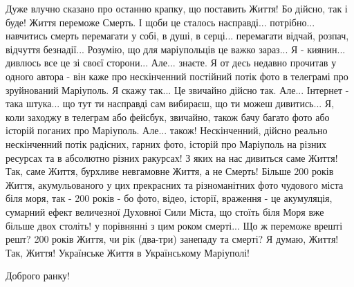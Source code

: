 
Дуже влучно сказано про останню крапку, що поставить Життя! Бо дійсно, так і
буде! Життя переможе Смерть. І щоби це сталось насправді... потрібно...
навчитись смерть перемагати у собі, в душі, в серці... перемагати відчай,
розпач, відчуття безнадії... Розумію, що для маріупольців це важко зараз... Я -
киянин... дивлюсь все це зі своєї сторони... Але... знаєте. Я от десь недавно
прочитав у одного автора - він каже про нескінченний постійний потік фото  в
телеграмі про зруйнований Маріуполь. Я скажу так... Це звичайно дійсно так.
Але... Інтернет - така штука... що тут ти насправді сам вибираєш, що ти можеш
дивитись... Я, коли заходжу в телеграм або фейсбук, звичайно, також бачу багато
фото або історій поганих про Маріуполь. Але... також! Нескінченний, дійсно
реально нескінченний потік радісних, гарних фото, історій про Маріуполь на
різних ресурсах та в абсолютно різних ракурсах! З яких на нас дивиться саме
Життя! Так, саме Життя, бурхливе невгамовне Життя, а не Смерть! Більше 200
років Життя, акумульованого у цих прекрасних та різноманітних фото чудового
міста біля моря, так - 200 років - бо фото, відео, історії, враження - це
акумуляція, сумарний ефект величезної Духовної Сили Міста, що стоїть біля Моря
вже більше двох століть! у порівнянні з цим роком смерті... Що ж переможе
врешті решт? 200 років Життя, чи рік (два-три) занепаду та смерті? Я думаю,
Життя! Так, Життя! Українське Життя в Українському Маріуполі! 💛💙💛💙


Доброго ранку! 

